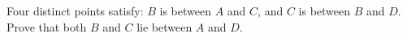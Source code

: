 Four distinct points satisfy: $B$ is between $A$ and $C$, and $C$ is between $B$ and $D$. Prove that both $B$ and $C$ lie between $A$ and $D$.
